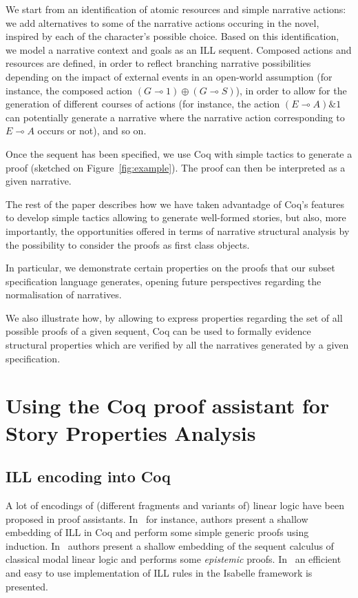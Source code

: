 \documentclass[runningheads,a4paper]{llncs}
\begin{document}
%
We start from an identification of atomic resources and simple narrative actions: we add alternatives to some of the narrative actions occuring in the novel, inspired by each of the character's possible choice. Based on this identification, we model a narrative context and goals as an ILL sequent. Composed actions and resources are defined, in order to reflect branching narrative possibilities depending on the impact of external events in an open-world assumption (for instance, the composed action $(G\multimap 1) \oplus (G \multimap S)$), in order to allow for the generation of different courses of actions (for instance, the action $(E\multimap A) \& 1$ can potentially generate a narrative where the narrative action corresponding to $E\multimap A$ occurs or not), and so on. 

Once the sequent has been specified, we use Coq with simple tactics to generate a proof (sketched on Figure~\ref{fig:example}). The proof can then be interpreted as a given narrative.

The rest of the paper describes how we have taken advantadge of Coq's features to develop simple tactics allowing to generate well-formed stories, but also, more importantly, the opportunities offered in terms of narrative structural analysis by the possibility to consider the proofs as first class objects.

In particular, we demonstrate certain properties on the proofs that our subset specification language generates, opening future perspectives regarding the normalisation of narratives.

We also illustrate how, by allowing to express properties regarding the set of all possible proofs of a given sequent, Coq can be used to formally evidence structural properties which are verified by all the narratives generated by a given specification.
%
\section{Using the Coq proof assistant for Story Properties Analysis}
\subsection{ILL encoding into Coq}
\label{sec:ill-encoding-into}
%
A lot of encodings of (different fragments and variants of) linear
logic have been proposed in proof assistants. In~\cite{Power99} for
instance, authors present a shallow embedding of ILL in Coq and
perform some simple generic proofs using induction.
In~\cite{Sadrzadeh03modallinear} authors present a shallow embedding
of the sequent calculus of classical modal linear logic and performs
some \emph{epistemic} proofs. In~\cite{Kalvala95mechanizinglinear} an
efficient and easy to use implementation of ILL rules in the Isabelle
framework is presented.
\end{document}
